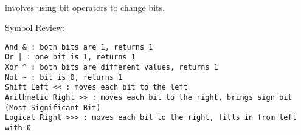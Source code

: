 \begin{blocksection}

\\

 involves using bit operators to change bits. 

Symbol Review: 
\begin{lstlisting}
And & : both bits are 1, returns 1
Or | : one bit is 1, returns 1
Xor ^ : both bits are different values, returns 1
Not ~ : bit is 0, returns 1
Shift Left << : moves each bit to the left
Arithmetic Right >> : moves each bit to the right, brings sign bit (Most Significant Bit)
Logical Right >>> : moves each bit to the right, fills in from left with 0 
\end{lstlisting}

\end{blocksection}
